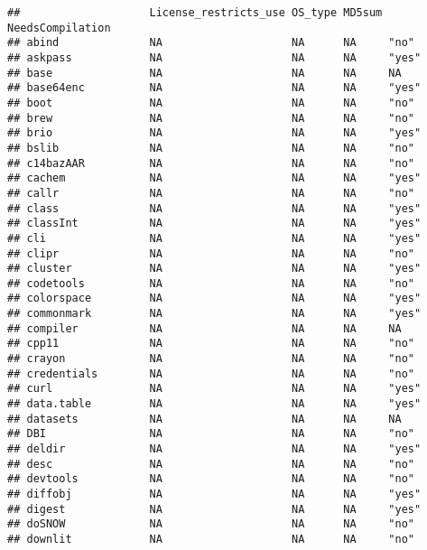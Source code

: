 \documentclass[
]{article}
\begin{document}
\begin{verbatim}
##                    License_restricts_use OS_type MD5sum NeedsCompilation
## abind              NA                    NA      NA     "no"            
## askpass            NA                    NA      NA     "yes"           
## base               NA                    NA      NA     NA              
## base64enc          NA                    NA      NA     "yes"           
## boot               NA                    NA      NA     "no"            
## brew               NA                    NA      NA     "no"            
## brio               NA                    NA      NA     "yes"           
## bslib              NA                    NA      NA     "no"            
## c14bazAAR          NA                    NA      NA     "no"            
## cachem             NA                    NA      NA     "yes"           
## callr              NA                    NA      NA     "no"            
## class              NA                    NA      NA     "yes"           
## classInt           NA                    NA      NA     "yes"           
## cli                NA                    NA      NA     "yes"           
## clipr              NA                    NA      NA     "no"            
## cluster            NA                    NA      NA     "yes"           
## codetools          NA                    NA      NA     "no"            
## colorspace         NA                    NA      NA     "yes"           
## commonmark         NA                    NA      NA     "yes"           
## compiler           NA                    NA      NA     NA              
## cpp11              NA                    NA      NA     "no"            
## crayon             NA                    NA      NA     "no"            
## credentials        NA                    NA      NA     "no"            
## curl               NA                    NA      NA     "yes"           
## data.table         NA                    NA      NA     "yes"           
## datasets           NA                    NA      NA     NA              
## DBI                NA                    NA      NA     "no"            
## deldir             NA                    NA      NA     "yes"           
## desc               NA                    NA      NA     "no"            
## devtools           NA                    NA      NA     "no"            
## diffobj            NA                    NA      NA     "yes"           
## digest             NA                    NA      NA     "yes"           
## doSNOW             NA                    NA      NA     "no"            
## downlit            NA                    NA      NA     "no"            

\end{verbatim}
\end{document}

